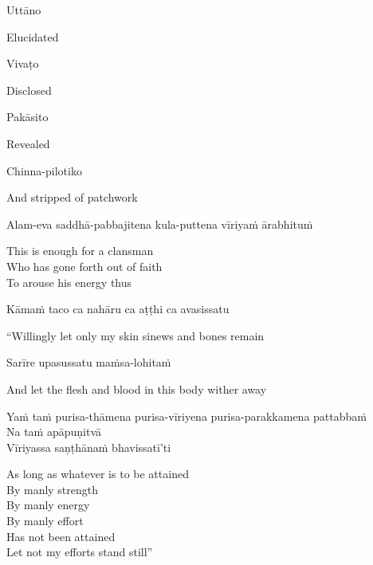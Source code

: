 Uttāno

\begin{cprenglish}
  Elucidated
\end{cprenglish}

Vivaṭo

\begin{cprenglish}
  Disclosed
\end{cprenglish}

Pakāsito

\begin{cprenglish}
  Revealed
\end{cprenglish}

Chinna-pilotiko

\begin{cprenglish}
  And stripped of patchwork
\end{cprenglish}

Alam-eva saddhā-pabbajitena kula-puttena vīriyaṁ ārabhituṁ

\begin{cprenglish}
  This is enough for a clansman\\
  Who has gone forth out of faith\\
  To arouse his energy thus
\end{cprenglish}

Kāmaṁ taco ca nahāru ca aṭṭhi ca avasissatu

\begin{cprenglish}
  “Willingly let only my skin  sinews  and bones remain
\end{cprenglish}

Sarīre upasussatu maṁsa-lohitaṁ

\begin{cprenglish}
  And let the flesh and blood in this body wither away
\end{cprenglish}

Yaṁ taṁ purisa-thāmena purisa-vīriyena purisa-parakkamena pattabbaṁ\\
Na taṁ apāpuṇitvā\\
Vīriyassa saṇṭhānaṁ bhavissatī’ti

\begin{cprenglish}
  As long as whatever is to be attained\\
  By manly strength\\
  By manly energy\\
  By manly effort\\
  Has not been attained\\
  Let not my efforts stand still”
\end{cprenglish}

